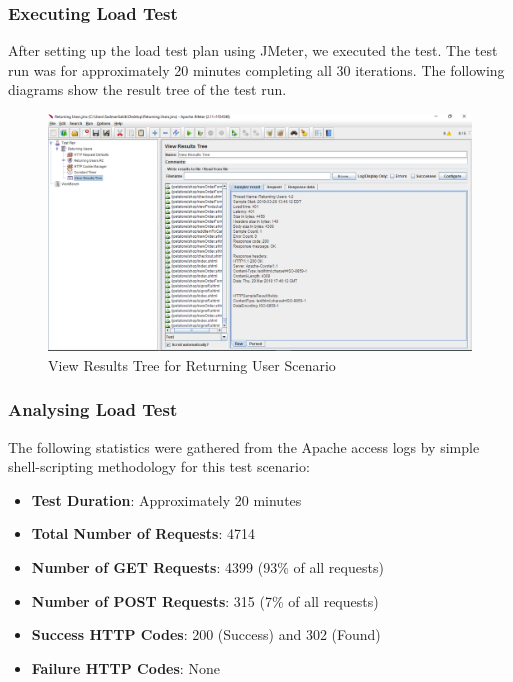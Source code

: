 \documentclass[fontsize=12pt,paper=letter,twoside]{scrartcl}
\begin{document}
\subsubsection{Executing Load Test}
After setting up the load test plan using JMeter, we executed the test. The test run was for approximately 20 minutes completing all 30 iterations. The following diagrams show the result tree of the test run.

\begin{figure}[!htb]
\begin{center}
\includegraphics[width=.9\textwidth]{../../load-test/test-plans/returning-user/result-tree.png}
\end{center}
\caption{View Results Tree for Returning User Scenario}
\label{fig:ruser:view_result_tree}
\end{figure}

\subsubsection{Analysing Load Test}
The following statistics were gathered from the Apache access logs by simple shell-scripting methodology for this test scenario:
\begin{itemize}
\item \textbf{Test Duration}: Approximately 20 minutes
\item \textbf{Total Number of Requests}: 4714
\item \textbf{Number of GET Requests}: 4399 (93\% of all requests)
\item \textbf{Number of POST Requests}: 315 (7\% of all requests)
\item \textbf{Success HTTP Codes}: 200 (Success) and 302 (Found)
\item \textbf{Failure HTTP Codes}: None
\end{itemize}
\end{document}
